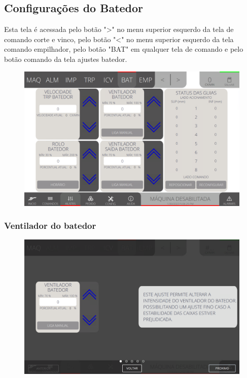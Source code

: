 \thispagestyle{fancy}
\vspace*{40 pt}
\subsection{Configurações do Batedor} \label{sec:telaConfiguracoesBatedor}
Esta tela é acessada pelo botão "\textgreater" no menu superior esquerdo da tela de comando corte e vinco, pelo botão "\textless{}" no menu superior esquerdo da tela comando empilhador, pelo botão "BAT" em qualquer tela de comando e pelo botão comando da tela ajustes batedor.
\vspace*{\fill}
\begin{figure}[h]
    \centering
    \includegraphics[width=480 px,height=300 px]{src/imagesICV/07-scout/settings/e-Tela-Principal.png}
\end{figure}
\vspace*{\fill}

\newpage
\thispagestyle{fancy}
\vspace*{40 pt}
\subsubsection{\small{Ventilador do batedor}} \label{sec:telaConfiguracoesBatedorVentiladorBatedor}
\vspace*{\fill}
\begin{figure}[h]
    \centering
    \includegraphics[width=576 px,height=360 px]{src/imagesICV/07-scout/settings/e-1.png}
\end{figure}
\vspace*{\fill}

